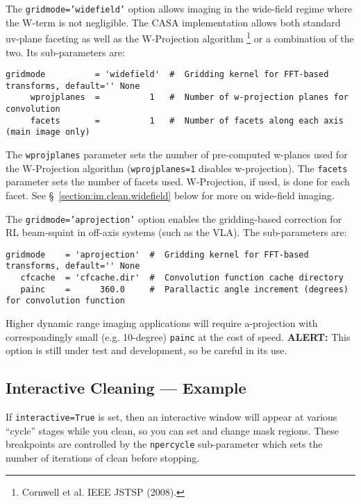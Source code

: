 The {\tt gridmode='widefield'} option allows imaging in the
wide-field regime where the W-term is not negligible.  The
CASA implementation allows both standard uv-plane faceting as
well as the W-Projection algorithm
\footnote{Cornwell et al. IEEE JSTSP (2008).}
or a combination of the two.  Its sub-parameters are:
\small
\begin{verbatim}
gridmode          = 'widefield'  #  Gridding kernel for FFT-based transforms, default='' None
     wprojplanes  =          1   #  Number of w-projection planes for convolution
     facets       =          1   #  Number of facets along each axis (main image only)
\end{verbatim}
\normalsize
The {\tt wprojplanes} parameter sets the number of pre-computed w-planes
used for the W-Projection algorithm ({\tt wprojplanes=1} disables
w-projection).  The {\tt facets} parameter sets the number of facets
used.  W-Projection, if used, is done for each facet.
See \S~\ref{section:im.clean.widefield} below for more on wide-field
imaging. 

The {\tt gridmode='aprojection'} option enables the gridding-based
correction for RL beam-squint in off-axis systems (such as the VLA).
The sub-parameters are:
\small
\begin{verbatim}
gridmode    = 'aprojection'  #  Gridding kernel for FFT-based transforms, default='' None
   cfcache  = 'cfcache.dir'  #  Convolution function cache directory
   painc    =      360.0     #  Parallactic angle increment (degrees) for convolution function
\end{verbatim}
\normalsize
Higher dynamic range imaging applications will require a-projection
with correspondingly small (e.g. 10-degree) {\tt painc} at the cost of
speed.  {\bf ALERT:} This option is still under test and development,
so be careful in its use.

\subsection{Interactive Cleaning --- Example}
\label{section:im.clean.exampleinteractive}

If {\tt interactive=True} is set, then an interactive window
will appear at various ``cycle'' stages while you clean, so you
can set and change mask regions.  These breakpoints are controlled
by the {\tt npercycle} sub-parameter which sets the number of
iterations of clean before stopping.

